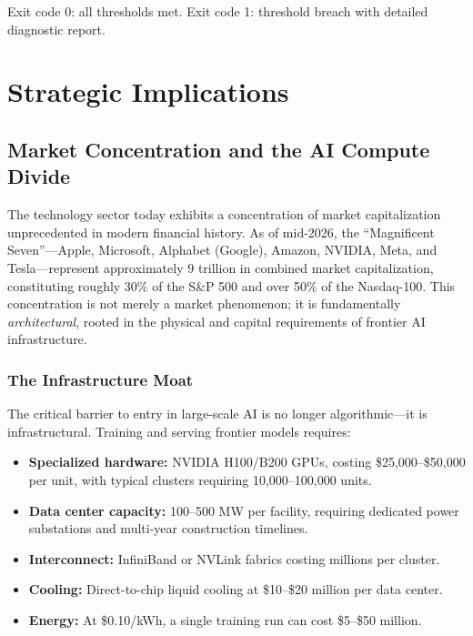 \documentclass[11pt,a4paper,openright]{book}
\begin{document}
Exit code 0: all thresholds met. Exit code 1: threshold breach with detailed diagnostic report.

\part{Strategic Implications}

\chapter{Market Concentration and the AI Compute Divide}
\label{ch:market}

The technology sector today exhibits a concentration of market capitalization unprecedented in modern financial history. As of mid-2026, the ``Magnificent Seven''---Apple, Microsoft, Alphabet (Google), Amazon, NVIDIA, Meta, and Tesla---represent approximately $9$ trillion in combined market capitalization, constituting roughly 30\% of the S\&P 500 and over 50\% of the Nasdaq-100. This concentration is not merely a market phenomenon; it is fundamentally \emph{architectural}, rooted in the physical and capital requirements of frontier AI infrastructure.

\section{The Infrastructure Moat}

The critical barrier to entry in large-scale AI is no longer algorithmic---it is infrastructural. Training and serving frontier models requires:

\begin{itemize}
	\item \textbf{Specialized hardware:} NVIDIA H100/B200 GPUs, costing \$25,000--\$50,000 per unit, with typical clusters requiring 10,000--100,000 units.
	\item \textbf{Data center capacity:} 100--500 MW per facility, requiring dedicated power substations and multi-year construction timelines.
	\item \textbf{Interconnect:} InfiniBand or NVLink fabrics costing millions per cluster.
	\item \textbf{Cooling:} Direct-to-chip liquid cooling at \$10--\$20 million per data center.
	\item \textbf{Energy:} At \$0.10/kWh, a single training run can cost \$5--\$50 million.
\end{itemize}
\end{document}
